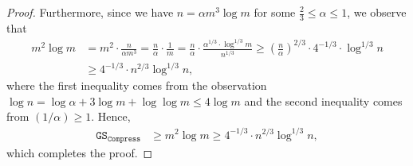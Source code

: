 \begin{proof}
Furthermore, since we have $n=\alpha m^3\log m$ for some $\frac{2}{3}\leq\alpha\leq 1$, we observe that
\begin{align*}
    m^2\log m &= m^2\cdot\frac{n}{\alpha m^3}= \frac{n}{\alpha}\cdot\frac{1}{m} = \frac{n}{\alpha}\cdot\frac{\alpha^{1/3}\cdot\log^{1/3}m}{n^{1/3}}
    \geq \left(\frac{n}{\alpha}\right)^{2/3}\cdot 4^{-1/3}\cdot\log^{1/3}n \\
    &\geq 4^{-1/3}\cdot n^{2/3}\log^{1/3}n,
\end{align*}
where the first inequality comes from the observation $\log n = \log\alpha + 3\log m + \log\log m\leq 4\log m$ and the second inequality comes from $(1/\alpha)\geq 1$. Hence,
\begin{align*}
    \mathtt{GS}_{\mathtt{Compress}} &\geq m^2\log m \geq 4^{-1/3}\cdot n^{2/3}\log^{1/3}n,
\end{align*}
which completes the proof.
\end{proof}